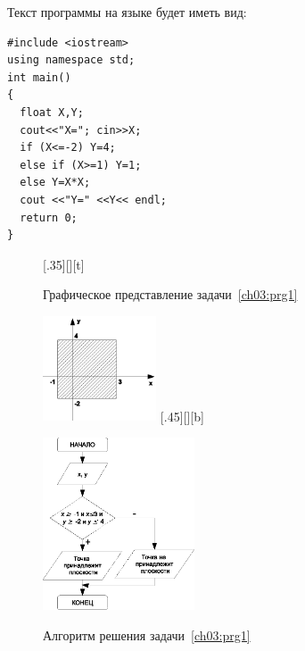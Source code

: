 Текст программы на языке  будет иметь вид:
\begin{lstlisting}
#include <iostream>
using namespace std;
int main()
{
  float X,Y;
  cout<<"X="; cin>>X;
  if (X<=-2) Y=4;
  else if (X>=1) Y=1;
  else Y=X*X;
  cout <<"Y=" <<Y<< endl;
  return 0;
}
\end{lstlisting}



\begin{figure}[H]
\begin{floatrow}
[.35\textwidth][\FBheight][t]
{\caption{Графическое представление задачи~\ref{ch03:prg1}}
\label{ch03:refDrawing11}}
{\includegraphics[width=0.3\textwidth,keepaspectratio]{img/ris_3_12}}\hspace*{0.05\textwidth}
%
[.45\textwidth][\FBheight][b]
{\caption{Алгоритм решения задачи~\ref{ch03:prg1}}
\label{ch03:refDrawing12}}
{\includegraphics[width=0.4\textwidth]{img/ris_3_13}}
\end{floatrow}
\end{figure}


